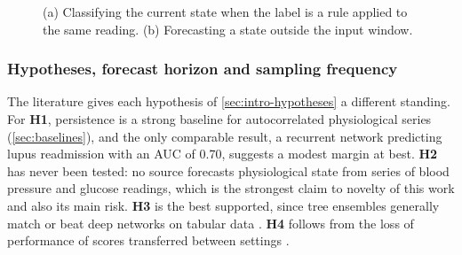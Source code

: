 \begin{figure}[htbp]
\centering
{}
\caption{(a) Classifying the current state when the label is a rule applied to the same reading. (b) Forecasting a state outside the input window.}\label{fig:leak-vs-forecast}
\end{figure}

\subsubsection{Hypotheses, forecast horizon and sampling frequency}\label{sec:forecasting}\label{sec:horizon}

The literature gives each hypothesis of \cref{sec:intro-hypotheses} a different standing. For \textbf{H1}, persistence is a strong baseline for autocorrelated physiological series (\cref{sec:baselines}), and the only comparable result, a recurrent network predicting lupus readmission with an AUC of 0.70, suggests a modest margin at best. \textbf{H2} has never been tested: no source forecasts physiological state from series of blood pressure and glucose readings, which is the strongest claim to novelty of this work and also its main risk. \textbf{H3} is the best supported, since tree ensembles generally match or beat deep networks on tabular data \parencite{grinsztajn2022}. \textbf{H4} follows from the loss of performance of scores transferred between settings \parencite{moore2017uva,tomas2026ews}.

